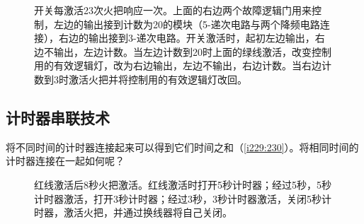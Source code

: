 \begin{figure}[!h]
\begin{center}
\qquad
{}
\end{center}
\caption{开关每激活23次火把响应一次。上面的右边两个故障逻辑门用来控制，左边的输出接到计数为20的模块（5-递次电路与两个降频电路连接），右边的输出接到3-递次电路。开关激活时，起初左边输出，右边不输出，左边计数。当左边计数到20时上面的绿线激活，改变控制用的有效逻辑灯，改为右边输出，左边不输出，右边计数。当右边计数到3时激活火把并将控制用的有效逻辑灯改回。}
\label{i231:232}
\end{figure}

\subsection{计时器串联技术}
将不同时间的计时器连接起来可以得到它们时间之和（\autoref{i229:230}）。将相同时间的计时器连接在一起如何呢？

\begin{figure}[!h]
\begin{center}
\qquad
{}
\end{center}
\caption{红线激活后8秒火把激活。红线激活时打开5秒计时器；经过5秒，5秒计时器激活，打开3秒计时器；经过3秒，3秒计时器激活，关闭5秒计时器，激活火把，并通过换线器将自己关闭。}
\label{i229:230}
\end{figure}

